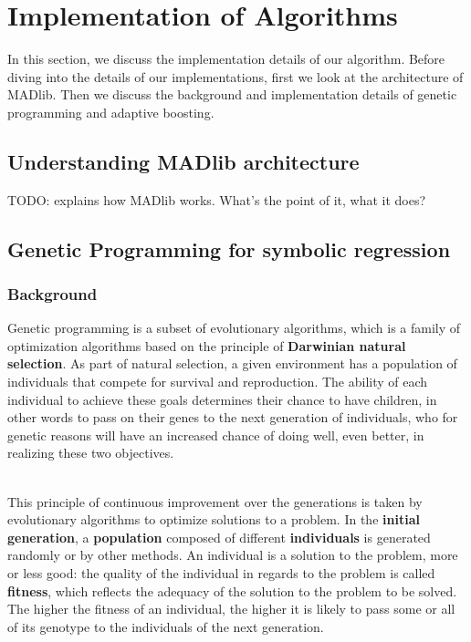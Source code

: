 
\section{Implementation of Algorithms}
\label{sec:imp}
In this section, we discuss the implementation details of our algorithm. Before diving into the details of our implementations, first we look at the architecture of MADlib. Then we discuss the background and implementation details of genetic programming and adaptive boosting.
\subsection{Understanding MADlib architecture}

TODO: explains how MADlib works. What's the point of it, what it does?

\subsection{Genetic Programming for symbolic regression}
\subsubsection{Background}

Genetic programming is a subset of evolutionary algorithms, which is a family of optimization algorithms based on the principle of \textbf{Darwinian natural selection}. As part of natural selection, a given environment has a population of individuals that compete for survival and reproduction. The ability of each individual to achieve these goals determines their chance to have children, in other words to pass on their genes to the next generation of individuals, who for genetic reasons will have an increased chance of doing well, even better, in realizing these two objectives.

~~\\
This principle of continuous improvement over the generations is taken by evolutionary algorithms to optimize solutions to a problem. In the \textbf {initial generation}, a \textbf{population} composed of different \textbf {individuals} is generated randomly or by other methods. An individual is a solution to the problem, more or less good: the quality of the individual in regards to the problem is called \textbf{fitness}, which reflects the adequacy of the solution to the problem to be solved. The higher the fitness of an individual, the higher it is likely to pass some or all of its genotype to the individuals of the next generation.


